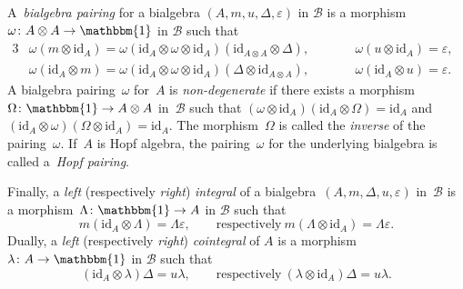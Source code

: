 \documentclass[pdftex]{sigma}
\numberwithin{equation}{section}
\newcommand{\co}{\colon}
\newcommand{\tens}{\otimes}
\newcommand{\id}{\mathrm{id}}
\newcommand{\mc}{\mathcal}
\newcommand{\uu}{\mathbbm{1}}
\newlength{\gnat}
\begin{document}
A~\textit{bialgebra pairing} for a bialgebra $(A,m,u, \Delta, \varepsilon)$ in $\mc B$ is a morphism~$\omega\co A \tens A \to \uu$ in $\mc B$ such that
\begin{alignat*}{3}
&\omega(m\tens \id_A)=\omega(\id_A\tens \omega\tens \id_A)(\id_{A\tens A}\tens \Delta), \qquad&& \omega(u\tens \id_A)= \varepsilon,&\\
&\omega(\id_A\tens m)=\omega(\id_A \tens \omega \tens \id_A)(\Delta \tens \id_{A\tens A}), \qquad&& \omega (\id_A \tens u) = \varepsilon.&
\end{alignat*}
A bialgebra pairing~$\omega$ for~$A$ is \textit{non-degenerate} if there exists a morphism~$\Omega\co \uu \to A\tens A$ in~$\mc B$ such that $(\omega\tens \id_A)(\id_A\tens\Omega)=\id_A$ and $(\id_A \tens \omega)(\Omega \tens \id_A)=\id_A$.
The morphism~$\Omega$ is called the \textit{inverse} of the pairing~$\omega$.
If~$A$ is Hopf algebra, the pairing~$\omega$ for the underlying bialgebra is called a~\textit{Hopf pairing}.

Finally, a \textit{left} (respectively \textit{right}) \emph{integral} of a bialgebra~$(A,m, \Delta,u, \varepsilon)$ in~$\mc B$ is a morphism~$\Lambda\co \uu \to A$ in $\mc B$ such that
\[m(\id_A\tens \Lambda)= \Lambda \varepsilon, \qquad \text{respectively} \ m(\Lambda \tens \id_A)=\Lambda \varepsilon.\]
Dually, a \textit{left} (respectively \textit{right}) \textit{cointegral} of $A$ is a morphism $\lambda \co A \to \uu$ in $\mc B$ such that
\[
(\id_A\tens \lambda )\Delta= u\lambda, \qquad \text{respectively} \ (\lambda \tens \id_A)\Delta= u \lambda.
\]
\end{document}
